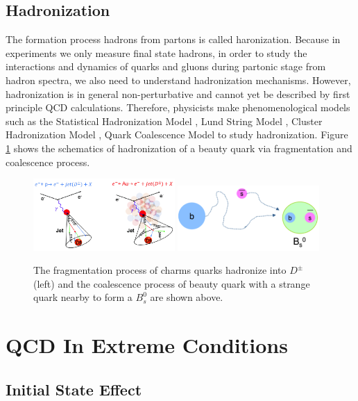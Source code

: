 \subsection{Hadronization}

The formation process hadrons from partons is called haronization. Because in experiments we only measure final state hadrons, in order to study the interactions and dynamics of quarks and gluons during partonic stage from hadron spectra, we also need to understand hadronization mechanisms. However, hadronization is in general non-perturbative and cannot yet be described by first principle QCD calculations. Therefore, physicists make phenomenological models such as the Statistical Hadronization Model \cite{SHM}, Lund String Model \cite{LSM}, Cluster Hadronization Model \cite{CHM}, Quark Coalescence Model \cite{QCM} to study hadronization. Figure  \ref{HadMech} shows the schematics of hadronization of a beauty quark via fragmentation and coalescence process.

\begin{figure}[hbtp]
\begin{center}
\includegraphics[width=0.48\textwidth]{Figures/Chapter1/FragCartoon.png}
\includegraphics[width=0.48\textwidth]{Figures/Chapter1/CoalCartoon.png}
\caption{The fragmentation process of charms quarks hadronize into $D^\pm$ (left) and the coalescence process of beauty quark with a strange quark nearby to form a $B^0_s$ are shown above.}
\label{HadMech}
\end{center}
\end{figure} 

\section{QCD In Extreme Conditions}

\subsection{Initial State Effect}

